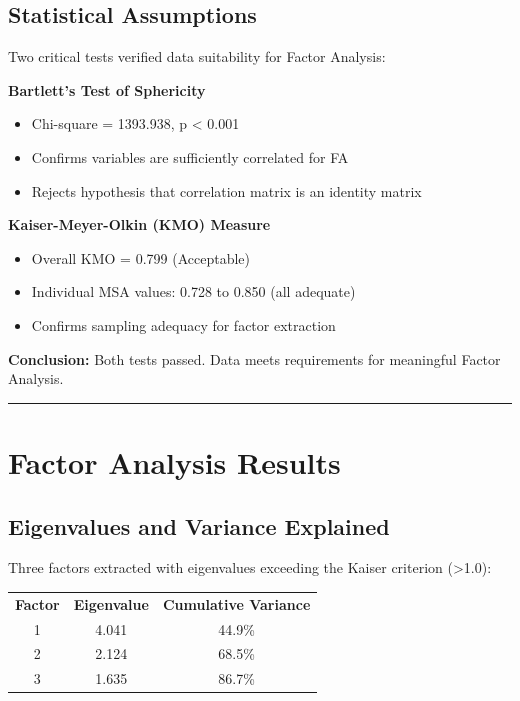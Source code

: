 \documentclass[
]{article}
\begin{document}
\subsection{Statistical Assumptions}

Two critical tests verified data suitability for Factor Analysis:

\textbf{Bartlett's Test of Sphericity}

\begin{itemize}
\item
  Chi-square = 1393.938, p \textless{} 0.001
\item
  Confirms variables are sufficiently correlated for FA
\item
  Rejects hypothesis that correlation matrix is an identity matrix
\end{itemize}

\textbf{Kaiser-Meyer-Olkin (KMO) Measure}

\begin{itemize}
\item
  Overall KMO = 0.799 (Acceptable)
\item
  Individual MSA values: 0.728 to 0.850 (all adequate)
\item
  Confirms sampling adequacy for factor extraction
\end{itemize}

\textbf{Conclusion:} Both tests passed. Data meets requirements for
meaningful Factor Analysis.

\begin{center}\rule{0.5\linewidth}{0.5pt}\end{center}

\section{Factor Analysis Results}

\subsection{Eigenvalues and Variance Explained}

Three factors extracted with eigenvalues exceeding the Kaiser criterion
(\textgreater1.0):

{\def\LTcaptype{none} %
\begin{longtable}[]{@{}ccc@{}}
\toprule\noalign{}
\endhead
\bottomrule\noalign{}
\endlastfoot
\textbf{Factor} & \textbf{Eigenvalue} & \textbf{Cumulative Variance} \\
1 & 4.041 & 44.9\% \\
2 & 2.124 & 68.5\% \\
3 & 1.635 & 86.7\% \\
\end{longtable}
}
\end{document}
